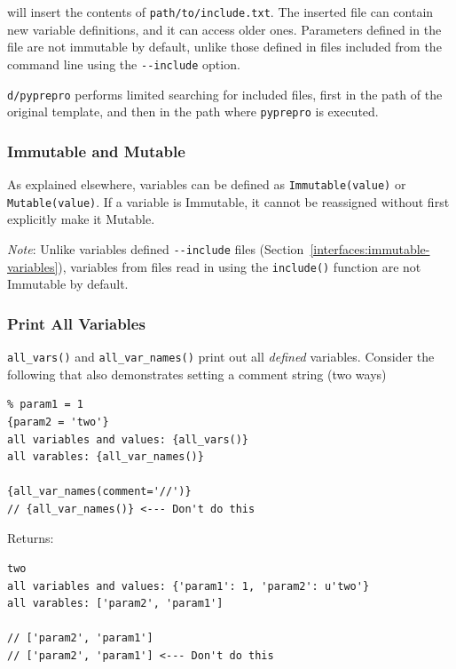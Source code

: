 {will insert the contents of
\texttt{\textquotesingle{}path/to/include.txt\textquotesingle{}}. The inserted
file can contain new variable definitions, and it can access older ones.
Parameters defined in the file are not immutable by default, unlike those
defined in files included from the command line using the \texttt{-\/-include} 
option.

\texttt{d/pyprepro} performs limited searching for included files, first
in the path of the original template, and then in the path where 
\texttt{pyprepro} is executed.

\subsubsection{Immutable and Mutable}\label{interfaces:immutable-and-mutable}

As explained elsewhere, variables can be defined as
\texttt{Immutable(value)} or \texttt{Mutable(value)}. If a variable is
Immutable, it cannot be reassigned without first explicitly make it Mutable.

\emph{Note}: Unlike variables defined \texttt{-\/-include} files 
(Section~\ref{interfaces:immutable-variables}), variables from files read in 
using the \texttt{include()} function are not Immutable by default.

\subsubsection{Print All Variables}\label{interfaces:print-all-variables}

\texttt{all\_vars()} and \texttt{all\_var\_names()} print out all
\emph{defined} variables. Consider the following that also demonstrates
setting a comment string (two ways)

\begin{verbatim}
% param1 = 1
{param2 = 'two'}
all variables and values: {all_vars()}
all varables: {all_var_names()}

{all_var_names(comment='//')}
// {all_var_names()} <--- Don't do this
\end{verbatim}

Returns:

\begin{verbatim}
two
all variables and values: {'param1': 1, 'param2': u'two'}
all varables: ['param2', 'param1']

// ['param2', 'param1']
// ['param2', 'param1'] <--- Don't do this
\end{verbatim}

}
